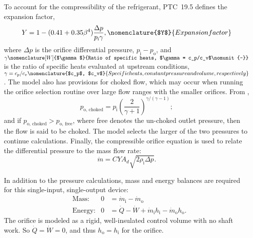 To account for the compressibility of the refrigerant, PTC~19.5 defines
the expansion factor,
\begin{equation}
Y = 1 - (0.41 + 0.35 \beta^4) \frac{\Delta p}{p_{\text{i}}\gamma},
\nomenclature{$Y$}{Expansion factor\nomunit{-}}
\end{equation}
where $\Delta p$ is the orifice differential pressure, $p_{\text{i}}-p_{\text{o}}$, and
$\gamma\nomenclature[W]{$\gamma$}{Ratio of specific heats, $\gamma = c_p/c_v$\nomunit{-}}$ 
is the ratio of specific heats evaluated at upstream conditions, 
$\gamma = c_p/c_v\nomenclature{$c_p$, $c_v$}{Specific heats, constant pressure and volume, respectively\nomunit{\btu\per\poundmass\rankine}}$.
%
%
%
%
%
The model also has provisions for choked flow, which may occur when 
running the orifice selection routine over large flow ranges with the smaller orifices.
From \textcite{munson2009}, 
\begin{equation}
p_{\text{o, choked}} = p_{\text{i}} \left(\frac{2}{\gamma+1}\right)^{\gamma/(\gamma-1)};
\end{equation}
and if $p_{\text{o, choked}} > p_{\text{o, free}}$, where free denotes 
the un-choked outlet pressure, then the flow is said to be choked.
The model selects the larger of the two pressures to continue calculations.
Finally, the compressible orifice equation is used to relate the differential pressure to the mass flow rate:
\begin{equation}
\dot{m} = C Y A_d \sqrt{2\rho_{\text{i}} \Delta p}.
\end{equation}

In addition to the pressure calculations, mass and energy balances are required
for this single-input, single-output device:
\begin{align}
  &\text{Mass:}   & 0 &= {\dot{m}_{\text{i}}} - {\dot{m}_{\text{o}}} \\ %
  &\text{Energy:} & 0 &= \dot{Q} - \dot{W} + {\dot{m}_{\text{i}}h_{\text{i}}} - 
		{\dot{m}_{\text{o}}h_{\text{o}}} \label{eqn:OrifEnergy}.
\end{align}
The orifice is modeled as a rigid, well-insulated control volume with no shaft work. 
So $\dot{Q}=\dot{W}=0$, and thus $h_{\text{o}} = h_{\text{i}}$ for the orifice.

